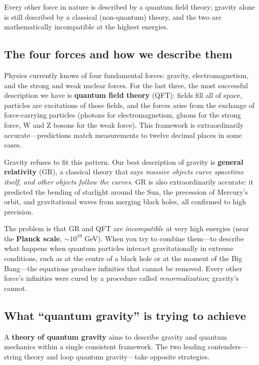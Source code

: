 \documentclass[11pt,a4paper]{article}
\newcommand{\term}[1]{\textbf{#1}}
\begin{document}
\begin{tcolorbox}[colback=boxblue,colframe=blue!40!black,title=The puzzle in one sentence]
Every other force in nature is described by a quantum field theory; gravity alone
is still described by a classical (non-quantum) theory, and the two are mathematically
incompatible at the highest energies.
\end{tcolorbox}

\subsection{The four forces and how we describe them}

Physics currently knows of four fundamental forces: gravity, electromagnetism, and the
strong and weak nuclear forces.  For the last three, the most successful description
we have is \term{quantum field theory} (QFT): fields fill all of space, particles are
excitations of those fields, and the forces arise from the exchange of force-carrying
particles (photons for electromagnetism, gluons for the strong force, W and Z bosons
for the weak force).  This framework is extraordinarily accurate---predictions match
measurements to twelve decimal places in some cases.

Gravity refuses to fit this pattern.  Our best description of gravity is
\term{general relativity} (GR), a classical theory that says
\emph{massive objects curve spacetime itself, and other objects follow the
curves}.  GR is also extraordinarily accurate: it predicted the bending of starlight
around the Sun, the precession of Mercury's orbit, and gravitational waves from
merging black holes, all confirmed to high precision.

The problem is that GR and QFT are \emph{incompatible} at very high energies (near
the \term{Planck scale}, $\sim10^{19}$ GeV).  When you try to combine them---to
describe what happens when quantum particles interact gravitationally in extreme
conditions, such as at the centre of a black hole or at the moment of the Big Bang---the
equations produce infinities that cannot be removed.  Every other force's infinities
were cured by a procedure called \emph{renormalization}; gravity's cannot.

\subsection{What ``quantum gravity'' is trying to achieve}

A \term{theory of quantum gravity} aims to describe gravity and quantum mechanics
within a single consistent framework.  The two leading contenders---string theory and
loop quantum gravity---take opposite strategies.
\end{document}
